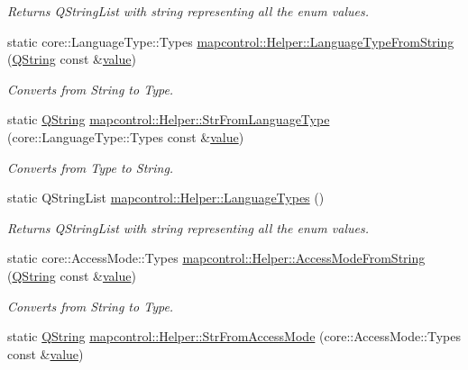 \begin{DoxyCompactItemize}
\begin{DoxyCompactList}\small\item\em Returns Q\-String\-List with string representing all the enum values. \end{DoxyCompactList}\item 
static core\-::\-Language\-Type\-::\-Types \hyperlink{group___o_p_map_widget_ga1a7989d295311b564112f0adc0e9158d}{mapcontrol\-::\-Helper\-::\-Language\-Type\-From\-String} (\hyperlink{group___u_a_v_objects_plugin_gab9d252f49c333c94a72f97ce3105a32d}{Q\-String} const \&\hyperlink{glext_8h_aa0e2e9cea7f208d28acda0480144beb0}{value})
\begin{DoxyCompactList}\small\item\em Converts from String to Type. \end{DoxyCompactList}\item 
static \hyperlink{group___u_a_v_objects_plugin_gab9d252f49c333c94a72f97ce3105a32d}{Q\-String} \hyperlink{group___o_p_map_widget_gaeb691bec877a44aa5e4270efaa965c2a}{mapcontrol\-::\-Helper\-::\-Str\-From\-Language\-Type} (core\-::\-Language\-Type\-::\-Types const \&\hyperlink{glext_8h_aa0e2e9cea7f208d28acda0480144beb0}{value})
\begin{DoxyCompactList}\small\item\em Converts from Type to String. \end{DoxyCompactList}\item 
static Q\-String\-List \hyperlink{group___o_p_map_widget_ga28c4df400106ab046111295c18abfa28}{mapcontrol\-::\-Helper\-::\-Language\-Types} ()
\begin{DoxyCompactList}\small\item\em Returns Q\-String\-List with string representing all the enum values. \end{DoxyCompactList}\item 
static core\-::\-Access\-Mode\-::\-Types \hyperlink{group___o_p_map_widget_ga800ba0d0ba832cda15296dcc2bad12c5}{mapcontrol\-::\-Helper\-::\-Access\-Mode\-From\-String} (\hyperlink{group___u_a_v_objects_plugin_gab9d252f49c333c94a72f97ce3105a32d}{Q\-String} const \&\hyperlink{glext_8h_aa0e2e9cea7f208d28acda0480144beb0}{value})
\begin{DoxyCompactList}\small\item\em Converts from String to Type. \end{DoxyCompactList}\item 
static \hyperlink{group___u_a_v_objects_plugin_gab9d252f49c333c94a72f97ce3105a32d}{Q\-String} \hyperlink{group___o_p_map_widget_gaff17bf5b9d2437f75977d8456ee9e737}{mapcontrol\-::\-Helper\-::\-Str\-From\-Access\-Mode} (core\-::\-Access\-Mode\-::\-Types const \&\hyperlink{glext_8h_aa0e2e9cea7f208d28acda0480144beb0}{value})

\end{DoxyCompactItemize}
